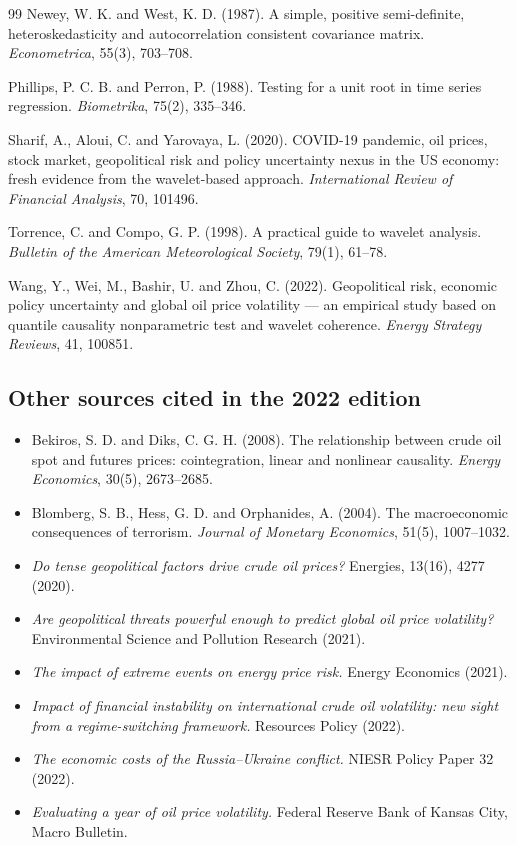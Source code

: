 \documentclass[11pt,a4paper]{article}
\begin{document}
\begin{thebibliography}{99}
Newey, W. K. and West, K. D. (1987). A simple, positive semi-definite,
heteroskedasticity and autocorrelation consistent covariance matrix.
\emph{Econometrica}, 55(3), 703--708.

Phillips, P. C. B. and Perron, P. (1988). Testing for a unit root in time series
regression. \emph{Biometrika}, 75(2), 335--346.

Sharif, A., Aloui, C. and Yarovaya, L. (2020). COVID-19 pandemic, oil prices,
stock market, geopolitical risk and policy uncertainty nexus in the US economy:
fresh evidence from the wavelet-based approach. \emph{International Review of
Financial Analysis}, 70, 101496.

Torrence, C. and Compo, G. P. (1998). A practical guide to wavelet analysis.
\emph{Bulletin of the American Meteorological Society}, 79(1), 61--78.

Wang, Y., Wei, M., Bashir, U. and Zhou, C. (2022). Geopolitical risk, economic
policy uncertainty and global oil price volatility --- an empirical study based
on quantile causality nonparametric test and wavelet coherence. \emph{Energy
Strategy Reviews}, 41, 100851.

\end{thebibliography}

\subsection*{Other sources cited in the 2022 edition}
{\small
\begin{itemize}[leftmargin=*]
\item Bekiros, S. D. and Diks, C. G. H. (2008). The relationship between crude oil
spot and futures prices: cointegration, linear and nonlinear causality.
\emph{Energy Economics}, 30(5), 2673--2685.
\item Blomberg, S. B., Hess, G. D. and Orphanides, A. (2004). The macroeconomic
consequences of terrorism. \emph{Journal of Monetary Economics}, 51(5),
1007--1032.
\item \emph{Do tense geopolitical factors drive crude oil prices?} Energies,
13(16), 4277 (2020).
\item \emph{Are geopolitical threats powerful enough to predict global oil price
volatility?} Environmental Science and Pollution Research (2021).
\item \emph{The impact of extreme events on energy price risk.} Energy Economics
(2021).
\item \emph{Impact of financial instability on international crude oil
volatility: new sight from a regime-switching framework.} Resources Policy (2022).
\item \emph{The economic costs of the Russia--Ukraine conflict.} NIESR Policy
Paper 32 (2022).
\item \emph{Evaluating a year of oil price volatility.} Federal Reserve Bank of
Kansas City, Macro Bulletin.
\end{itemize}
}
\end{document}
